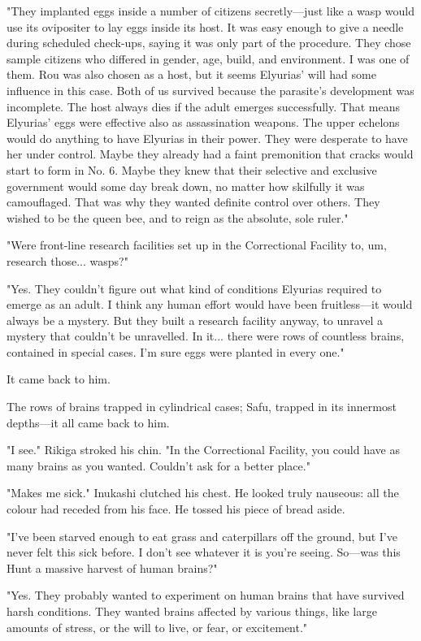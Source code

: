 "They implanted eggs inside a number of citizens secretly---just like a
wasp would use its ovipositer to lay eggs inside its host. It was easy
enough to give a needle during scheduled check-ups, saying it was only
part of the procedure. They chose sample citizens who differed in
gender, age, build, and environment. I was one of them. Rou was also
chosen as a host, but it seems Elyurias' will had some influence in this
case. Both of us survived because the parasite's development was
incomplete. The host always dies if the adult emerges successfully. That
means Elyurias' eggs were effective also as assassination weapons. The
upper echelons would do anything to have Elyurias in their power. They
were desperate to have her under control. Maybe they already had a faint
premonition that cracks would start to form in No. 6. Maybe they knew
that their selective and exclusive government would some day break down,
no matter how skilfully it was camouflaged. That was why they wanted
definite control over others. They wished to be the queen bee, and to
reign as the absolute, sole ruler."

"Were front-line research facilities set up in the Correctional Facility
to, um, research those... wasps?"

"Yes. They couldn't figure out what kind of conditions Elyurias required
to emerge as an adult. I think any human effort would have been
fruitless---it would always be a mystery. But they built a research
facility anyway, to unravel a mystery that couldn't be unravelled. In
it... there were rows of countless brains, contained in special cases.
I'm sure eggs were planted in every one."

It came back to him.

The rows of brains trapped in cylindrical cases; Safu, trapped in its
innermost depths---it all came back to him.

"I see." Rikiga stroked his chin. "In the Correctional Facility, you
could have as many brains as you wanted. Couldn't ask for a better
place."

"Makes me sick." Inukashi clutched his chest. He looked truly nauseous:
all the colour had receded from his face. He tossed his piece of bread
aside.

"I've been starved enough to eat grass and caterpillars off the ground,
but I've never felt this sick before. I don't see whatever it is you're
seeing. So---was this Hunt a massive harvest of human brains?"

"Yes. They probably wanted to experiment on human brains that have
survived harsh conditions. They wanted brains affected by various
things, like large amounts of stress, or the will to live, or fear, or
excitement."

